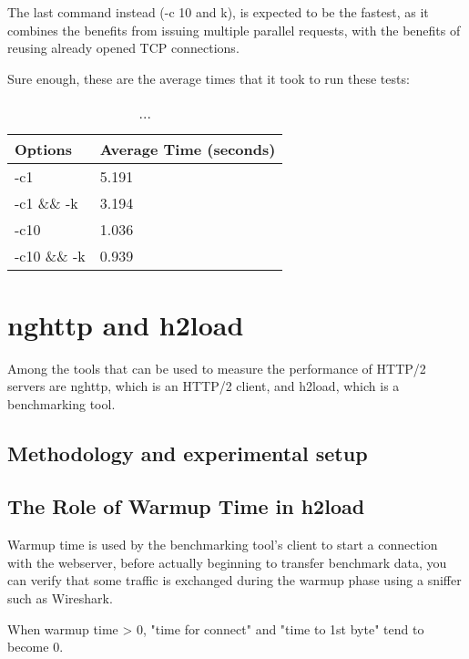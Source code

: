 \documentclass[a4paper,10pt]{article}
\begin{document}
The last command instead (-c 10 and k), is expected to be the fastest, as it combines the benefits from issuing multiple parallel requests, with the benefits of reusing already opened TCP connections.

Sure enough, these are the average times that it took to run these tests:




\begin{table}[h!]
\centering
\begin{tabular}{|l|l|}
\hline
Options      & Average Time (seconds) \\ \hline
-c1          & 5.191        \\ \hline
-c1 \&\& -k  & 3.194        \\ \hline
-c10         & 1.036        \\ \hline
-c10 \&\& -k & 0.939        \\ \hline



\end{tabular}

\caption{...}
\label{fig:table3}

\end{table}



\section{nghttp and h2load}
Among the tools that can be used to measure the performance of HTTP/2 servers are nghttp, which is an HTTP/2 client, and h2load, which is a benchmarking tool.


\subsection{Methodology and experimental setup}


\subsection{The Role of Warmup Time in h2load}

Warmup time is used by the benchmarking tool's client to start a connection with the 
webserver, before actually beginning to transfer benchmark data, you can verify that some traffic is exchanged during the warmup phase using a sniffer such as Wireshark.

When warmup time > 0, "time for connect" and "time to 1st byte" tend to become 0.
\end{document}
